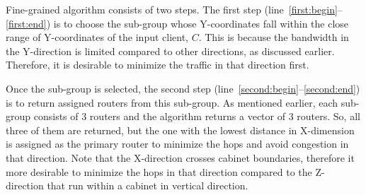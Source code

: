 Fine-grained algorithm consists of two steps. The first step (line~\ref{first:begin}--\ref{first:end}) is to choose the sub-group whose Y-coordinates fall within the close range of Y-coordinates of the input client, $C$. This is because the bandwidth in the Y-direction is limited compared to other directions, as discussed earlier. Therefore, it is desirable to minimize the traffic in that direction first. 

Once the sub-group is selected, the second step (line~\ref{second:begin}--\ref{second:end}) is to return assigned routers from this sub-group. As mentioned earlier, each sub-group consists of 3 routers and the algorithm returns a vector of 3 routers. So, all three of them are returned, but the one with the lowest distance in X-dimension is assigned as the primary router to minimize the hops and avoid congestion in that direction. Note that the X-direction crosses cabinet boundaries, therefore it more desirable to minimize the hops in that direction compared to the Z-direction that run within a cabinet in vertical direction.


